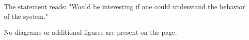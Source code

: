 The statement reads:  
"Would be interesting if one could understand the behavior of the system."  

No diagrams or additional figures are present on the page.